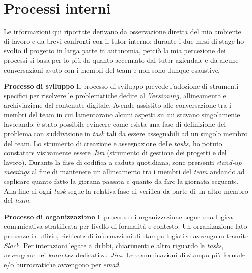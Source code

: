\section{Processi interni}

Le informazioni qui riportate derivano da osservazione diretta del mio ambiente di lavoro e da brevi confronti con il tutor interno; 
durante i due mesi di stage ho svolto il progetto in larga parte in autonomia, perciò la mia percezione dei processi si basa per lo più da quanto accennato dal tutor aziendale
e da alcune conversazioni avuto con i membri del team e non sono dunque esaustive.


\medskip
\noindent\textbf{Processo di sviluppo}
Il processo di sviluppo prevede l'adozione di strumenti specifici per risolvere le problematiche dedite al \emph{Versioning}, allineamento e archiviazione del contenuto digitale.
Avendo assistito alle conversazione tra i membri del team in cui lamentavano alcuni aspetti su cui stavano singolamente lavorando, è stato possibile evincere come esista
una fase di definizione del problema con suddivisione in \emph{task} tali da essere assegnabili ad un singolo membro del team.
Lo strumento di creazione e assegnazione delle \emph{tasks}, ho potuto constatare visivamente essere \emph{Jira} (strumento di gestione dei progetti e del lavoro).
Durante la fase di codifica a caduta quotidiana, sono prersenti \emph{stand-up meetings} al fine di mantenere un allineamento tra i membri del \emph{team} andando ad esplicare
quanto fatto la giorana passata e quanto da fare la giornata seguente.
Alla fine di ogni \emph{task} segue la relativa fase di verifica da parte di un altro membro del \emph{team}.


\medskip
\noindent\textbf{Processo di organizzazione}
Il processo di organizzazione segue una logica comunicativa stratificata per livello di formalità e contesto.
Un organizazione lato presenze in ufficio, richieste di informazioni di stampo logistico avvengono tramite \emph{Slack}.
Per interazioni legate a dubbi, chiarimenti e altro riguardo le \emph{tasks}, avvengono nei \emph{branches} dedicati su \emph{Jira}.
Le comunicazioni di stampo più formale e/o burrocratiche avvengono per \emph{email}.


